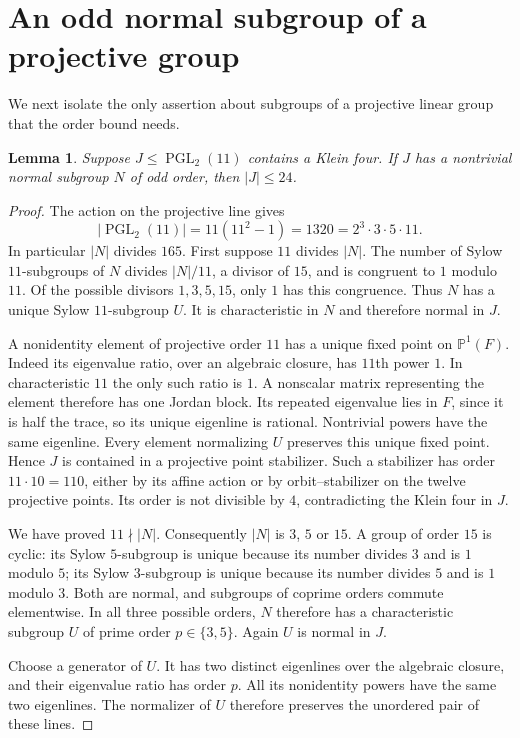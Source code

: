 \documentclass[11pt]{article}
\newtheorem{lemma}[theorem]{Lemma}
\newcommand{\PGL}{\operatorname{PGL}}
\begin{document}
\section{An odd normal subgroup of a projective group}
We next isolate the only assertion about subgroups of a projective linear
group that the order bound needs.

\begin{lemma}\label{lem:odd}
Suppose $J\leq\PGL_2(11)$ contains a Klein four. If $J$ has a nontrivial
normal subgroup $N$ of odd order, then $|J|\leq24$.
\end{lemma}
\begin{proof}
The action on the projective line gives
\[
 |\PGL_2(11)|=11(11^2-1)=1320=2^3\cdot3\cdot5\cdot11.
\]
In particular $|N|$ divides $165$. First suppose $11$ divides $|N|$.
The number of Sylow $11$-subgroups of $N$ divides $|N|/11$, a divisor of
$15$, and is congruent to $1$ modulo $11$. Of the possible divisors
$1,3,5,15$, only $1$ has this congruence. Thus $N$ has a unique Sylow
$11$-subgroup $U$. It is characteristic in $N$ and therefore normal in $J$.

A nonidentity element of projective order $11$ has a unique fixed point
on $\mathbb P^1(F)$. Indeed its eigenvalue ratio, over an algebraic
closure, has $11$th power $1$. In characteristic $11$ the only such ratio
is $1$. A nonscalar matrix representing the element therefore has one
Jordan block. Its repeated eigenvalue lies in $F$, since it is half the
trace, so its unique eigenline is rational. Nontrivial powers have the
same eigenline. Every element normalizing $U$ preserves this unique
fixed point. Hence $J$ is contained in a projective point stabilizer.
Such a stabilizer has order $11\cdot10=110$, either by its affine action
or by orbit--stabilizer on the twelve projective points. Its order is not
divisible by $4$, contradicting the Klein four in $J$.

We have proved $11\nmid |N|$. Consequently $|N|$ is $3$, $5$ or $15$.
A group of order $15$ is cyclic: its Sylow $5$-subgroup is unique because
its number divides $3$ and is $1$ modulo $5$; its Sylow $3$-subgroup is
unique because its number divides $5$ and is $1$ modulo $3$. Both are
normal, and subgroups of coprime orders commute elementwise. In all
three possible orders, $N$ therefore has a characteristic subgroup $U$
of prime order $p\in\{3,5\}$. Again $U$ is normal in $J$.

Choose a generator of $U$. It has two distinct eigenlines over the
algebraic closure, and their eigenvalue ratio has order $p$. All its
nonidentity powers have the same two eigenlines. The normalizer of $U$
therefore preserves the unordered pair of these lines.


\end{proof}
\end{document}
